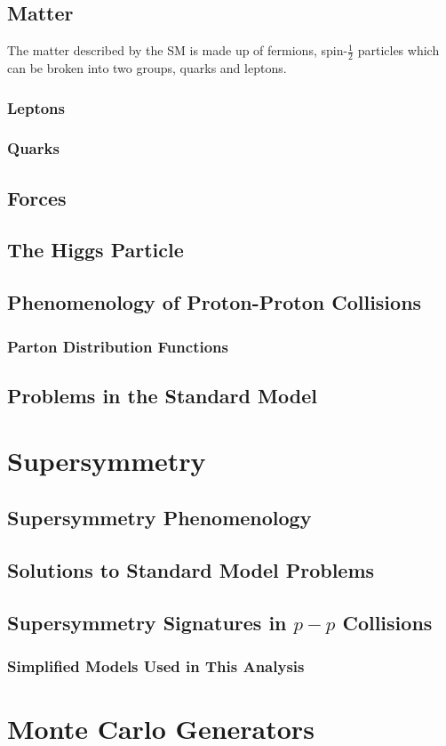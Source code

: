 \subsection{Matter}
The matter described by the \ac{SM} is made up of fermions, spin-$\frac{1}{2}$ particles which can be broken into two groups, quarks and leptons.

\subsubsection{Leptons}


\subsubsection{Quarks}



\subsection{Forces}

\subsection{The Higgs Particle}

\subsection{Phenomenology of Proton-Proton Collisions}
\subsubsection{Parton Distribution Functions}


\subsection{Problems in the Standard Model}
\label{sec:sm_problems}



\section{Supersymmetry}

\subsection{Supersymmetry Phenomenology}
\subsection{Solutions to Standard Model Problems}
\subsection{Supersymmetry Signatures in $p-p$ Collisions}
\subsubsection{Simplified Models Used in This Analysis}
\label{sec:simplified_models}

\section{Monte Carlo Generators}
\label{sec:MC_gen}